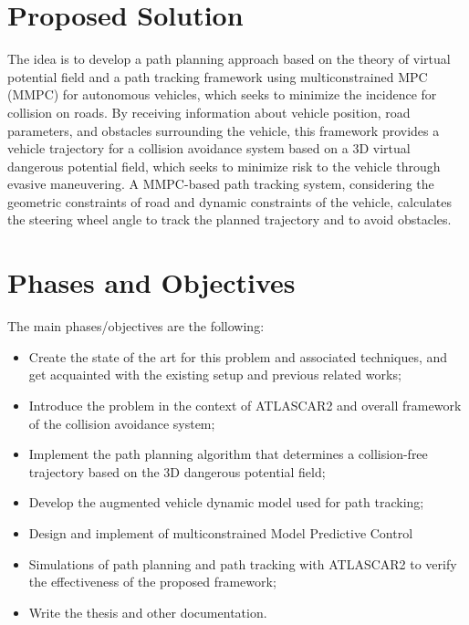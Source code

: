 \documentclass[11pt]{IEEEtran}
\begin{document}
\section{Proposed Solution}
The idea is to develop a path planning approach based on the
theory of virtual potential field and a path tracking framework using multiconstrained MPC (MMPC) for autonomous vehicles, which seeks to minimize the incidence for collision on roads. By receiving information about vehicle position, road parameters, and obstacles surrounding the vehicle, this framework provides a vehicle trajectory for a collision avoidance system based on a 3D virtual dangerous potential field, which seeks to minimize risk to the vehicle through evasive maneuvering. A MMPC-based path tracking system, considering the geometric constraints of road and dynamic constraints of the vehicle, calculates the steering wheel angle to track the planned trajectory and to avoid obstacles.

\section{Phases and Objectives}
The main phases/objectives are the following:
\begin{itemize}
	\item Create the state of the art for this problem and associated techniques, and get acquainted with the existing setup and previous related works;
	\item Introduce the problem in the context of ATLASCAR2 and overall framework of the collision avoidance system;
	\item Implement the path planning algorithm that determines a collision-free trajectory based on the 3D dangerous potential field;
	\item Develop the augmented vehicle dynamic model used for path tracking;
	\item Design and implement of multiconstrained Model Predictive Control
	\item Simulations of path planning and path tracking with ATLASCAR2 to verify the effectiveness of the proposed framework;
	\item Write the thesis and other documentation.
\end{itemize}
\end{document}
